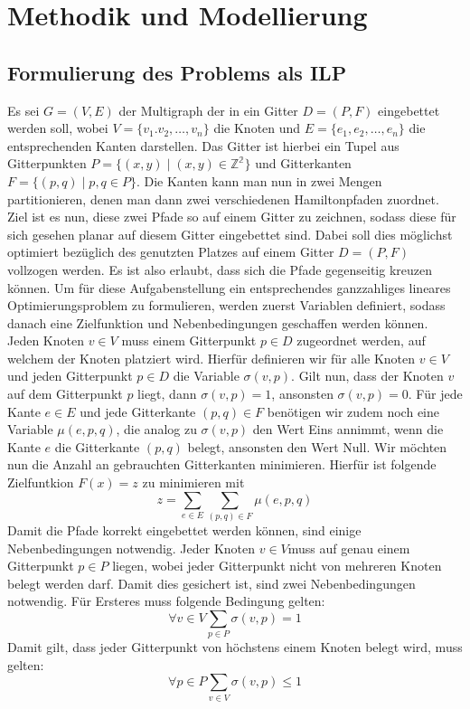 \documentclass[bachelor, german]{algothesis}
\begin{document}
\chapter{Methodik und Modellierung}
\section{Formulierung des Problems als ILP}
Es sei $G = (V,E)$ der Multigraph der in ein Gitter $D=(P,F)$ eingebettet werden soll, wobei $V=\{v_1.v_2,\dots, v_n\} $ die Knoten und $E=\{e_1, e_2, \dots, e_n\}$ die entsprechenden Kanten darstellen. Das Gitter ist hierbei ein Tupel aus Gitterpunkten $P=\{(x,y) \mid (x,y) \in \mathbb{Z^2} \}$ und Gitterkanten $F=\{(p,q) \mid p,q \in P\}$. Die Kanten kann man nun in zwei Mengen partitionieren, denen man dann zwei verschiedenen Hamiltonpfaden zuordnet. Ziel ist es nun, diese zwei Pfade so auf einem Gitter zu zeichnen, sodass diese für sich gesehen planar auf diesem Gitter eingebettet sind. Dabei soll dies möglichst optimiert bezüglich des genutzten Platzes auf einem Gitter $D=(P,F)$ vollzogen werden. Es ist also erlaubt, dass sich die Pfade gegenseitig kreuzen können. \newline
Um für diese Aufgabenstellung ein entsprechendes ganzzahliges lineares Optimierungsproblem zu formulieren, werden zuerst Variablen definiert, sodass danach eine Zielfunktion und Nebenbedingungen geschaffen werden können. \newline
Jeden Knoten $v \in V$ muss einem Gitterpunkt $p \in D$ zugeordnet werden, auf welchem der Knoten platziert wird. Hierfür definieren wir für alle Knoten $v \in V$ und jeden Gitterpunkt $p \in D$ die Variable $\sigma(v,p)$. Gilt nun, dass der Knoten $v$ auf dem Gitterpunkt $p$ liegt, dann $\sigma(v,p) = 1$, ansonsten $\sigma(v,p) = 0$.  \newline
Für jede Kante $e \in E$ und jede Gitterkante $(p,q) \in F$ benötigen wir zudem noch eine Variable $\mu(e,p,q)$, die analog zu $\sigma(v,p)$ den Wert Eins annimmt, wenn die Kante $e$ die Gitterkante $(p,q)$ belegt, ansonsten den Wert Null.\newline
Wir möchten nun die Anzahl an gebrauchten Gitterkanten minimieren. Hierfür ist folgende Zielfuntkion $F(x) = z$  zu minimieren mit $$z = \sum_{e \in E} \sum_{(p,q) \in F} \mu(e,p,q)$$
Damit die Pfade korrekt eingebettet werden können, sind einige Nebenbedingungen notwendig.
Jeder Knoten $v \in V$muss auf genau einem Gitterpunkt $p \in P$ liegen, wobei jeder Gitterpunkt nicht von mehreren Knoten belegt werden darf. Damit dies gesichert ist, sind zwei Nebenbedingungen notwendig. Für Ersteres muss folgende Bedingung gelten: $$ \forall v \in V \sum_{p \in P} \sigma(v,p) = 1$$ Damit gilt, dass jeder Gitterpunkt von höchstens einem Knoten belegt wird, muss gelten: $$\forall p \in P \sum_{v \in V} \sigma(v,p) \leq 1$$ 
\end{document}
